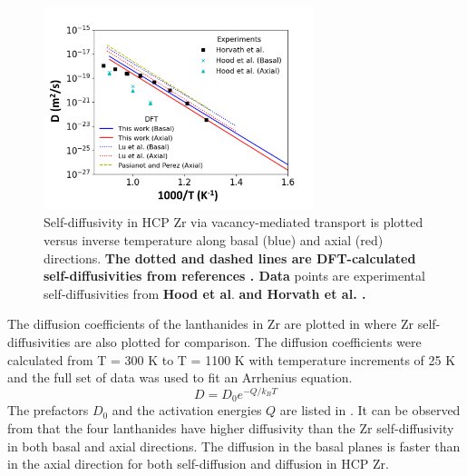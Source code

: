 \documentclass[preprint,12pt]{elsarticle}
\providecommand{\DIFadd}[1]{{\bf #1}} %
\providecommand{\DIFdel}[1]{} %
\providecommand{\DIFaddbegin}{\protect\color{blue}} %
\providecommand{\DIFaddend}{\protect\color{black}} %
\providecommand{\DIFdelbegin}{\protect\color{red}} %
\providecommand{\DIFdelend}{\protect\color{black}} %
\providecommand{\DIFaddFL}[1]{\DIFadd{#1}} %
\providecommand{\DIFdelFL}[1]{\DIFdel{#1}} %
\providecommand{\DIFaddbeginFL}{} %
\providecommand{\DIFaddendFL}{} %
\providecommand{\DIFdelbeginFL}{} %
\providecommand{\DIFdelendFL}{} %
\newcommand{\DIFscaledelfig}{0.5}
\newlength{\DIFdelgraphicswidth} %
\newlength{\DIFdelgraphicsheight} %
\newcommand{\DIFaddincludegraphics}[2][]{{\color{blue}\fbox{\DIFOincludegraphics[#1]{#2}}}} %
\newcommand{\DIFdelincludegraphics}[2][]{%
\sbox{\DIFdelgraphicsbox}{\DIFOincludegraphics[#1]{#2}}%
\settoboxwidth{\DIFdelgraphicswidth}{\DIFdelgraphicsbox} %
\settoboxtotalheight{\DIFdelgraphicsheight}{\DIFdelgraphicsbox} %
\scalebox{\DIFscaledelfig}{%
\parbox[b]{\DIFdelgraphicswidth}{\usebox{\DIFdelgraphicsbox}\\[-\baselineskip] \rule{\DIFdelgraphicswidth}{0em}}\llap{\resizebox{\DIFdelgraphicswidth}{\DIFdelgraphicsheight}{%
\setlength{\unitlength}{\DIFdelgraphicswidth}%
\begin{picture}(1,1)%
\thicklines\linethickness{2pt} %
{\color[rgb]{1,0,0}\put(0,0){\framebox(1,1){}}}%
{\color[rgb]{1,0,0}\put(0,0){\line( 1,1){1}}}%
{\color[rgb]{1,0,0}\put(0,1){\line(1,-1){1}}}%
\end{picture}%
}\hspace*{3pt}}} %
} %
\DeclareRobustCommand{\DIFaddbegin}{\DIFOaddbegin \let\includegraphics\DIFaddincludegraphics} %
\DeclareRobustCommand{\DIFaddend}{\DIFOaddend \let\includegraphics\DIFOincludegraphics} %
\DeclareRobustCommand{\DIFdelbegin}{\DIFOdelbegin \let\includegraphics\DIFdelincludegraphics} %
\DeclareRobustCommand{\DIFdelend}{\DIFOaddend \let\includegraphics\DIFOincludegraphics} %
\DeclareRobustCommand{\DIFaddbeginFL}{\DIFOaddbeginFL \let\includegraphics\DIFaddincludegraphics} %
\DeclareRobustCommand{\DIFaddendFL}{\DIFOaddendFL \let\includegraphics\DIFOincludegraphics} %
\DeclareRobustCommand{\DIFdelbeginFL}{\DIFOdelbeginFL \let\includegraphics\DIFdelincludegraphics} %
\DeclareRobustCommand{\DIFdelendFL}{\DIFOaddendFL \let\includegraphics\DIFOincludegraphics} %
\begin{document}
\begin{figure}[h!]
    \centering
    \DIFdelbeginFL %
\DIFdelendFL \DIFaddbeginFL \includegraphics[width=0.7\textwidth]{4_self_diff_added_f0_dft_literature.jpg}
    \DIFaddendFL \caption{Self-diffusivity in HCP Zr via vacancy-mediated transport is plotted versus inverse temperature along basal (blue) and axial (red) directions. \DIFdelbeginFL \DIFdelFL{Scattered data }\DIFdelendFL \DIFaddbeginFL \DIFaddFL{The dotted and dashed lines are DFT-calculated self-diffusivities from references \cite{pasianot_issues_2012, lu_first-principles_2018}. Data }\DIFaddendFL points are experimental self-diffusivities from \DIFdelbeginFL \DIFdelFL{references \cite{hood_self-_1997, horvath_anomalous_1984}}\DIFdelendFL \DIFaddbeginFL \DIFaddFL{Hood et al}\DIFaddendFL . \DIFaddbeginFL \DIFaddFL{\cite{hood_self-_1997} and Horvath et al. \cite{horvath_anomalous_1984}.}\DIFaddendFL }
    \label{fig:self_diff}
\end{figure}

The diffusion coefficients of the lanthanides in Zr are plotted in  where Zr self-diffusivities are also plotted for comparison.  The diffusion coefficients were calculated from T = 300 K to T = 1100 K with temperature increments of 25 K and the full set of data was used to fit an Arrhenius equation.
\begin{equation}
    D = D_0 e^{-Q/{k_B T}}
\end{equation}
The prefactors $D_0$ and the activation energies $Q$ are listed in . It can be observed from  that the four lanthanides have higher diffusivity than the Zr self-diffusivity in both basal and axial directions. The diffusion in the basal planes is faster than in the axial direction for both self-diffusion and \DIFdelbegin \DIFdel{lanthanides }\DIFdelend \DIFaddbegin \DIFadd{lanthanide }\DIFaddend diffusion in HCP Zr.
\end{document}
